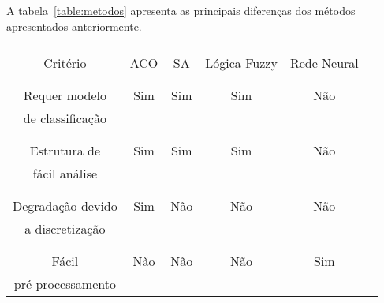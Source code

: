 A tabela~\ref{table:metodos} apresenta as principais diferenças dos métodos
apresentados anteriormente.



 \begin{table}
   \begin{center}
     \begin{tabular}{|c|c|c|c|c|c|}
       \hline
                         &          &           &              &            \\
       Critério          &  ACO     &    SA     & Lógica Fuzzy & Rede Neural\\
                         &          &           &              &            \\
       \hline
                         &          &           &              &            \\
       Requer modelo     &   Sim    &    Sim    &     Sim      &    Não     \\
       de classificação  &          &           &              &            \\
                         &          &           &              &            \\
       \hline
                         &          &           &              &            \\
       Estrutura de      &   Sim    &    Sim    &     Sim      &    Não     \\
       fácil análise     &          &           &              &            \\
                         &          &           &              &            \\
       \hline
                         &          &           &              &            \\
       Degradação devido &   Sim    &    Não    &     Não      &    Não     \\
       a discretização   &          &           &              &            \\
                         &          &           &              &            \\
       \hline
                         &          &           &              &            \\
       Fácil             &   Não    &    Não    &     Não      &    Sim     \\
       pré-processamento &          &           &              &            \\

\end{tabular}
\end{center}
\end{table}
